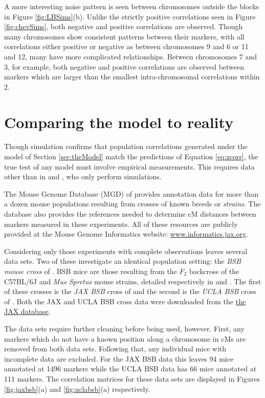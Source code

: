 \documentclass[sts]{imsart}
\begin{document}
A more interesting noise pattern is seen between chromosomes outside the blocks in Figure \ref{fig:LBSims}(b). Unlike the strictly positive correlations seen in Figure \ref{fig:chevSims}, both negative and positive correlations are observed. Though many chromosomes show consistent patterns between their markers, with all correlations either positive or negative as between chromosomes 9 and 6 or 11 and 12, many have more complicated relationships. Between chromosomes 7 and 3, for example, both negative and positive correlations are observed between markers which are larger than the smallest intra-chromosomal correlations within 2.

\section{Comparing the model to reality} \label{sec:model2real}

Though simulation confirms that population correlations generated under the model of Section \ref{sec:theModel} match the predictions of Equation \ref{eq:zcorr}, the true test of any model must involve empirical measurements. This requires data other than in \cite{LanderBotstein1989} and \cite{cheverud2001}, who only perform simulations.

The Mouse Genome Database (MGD) of \cite{bultetal2019mouse} provides annotation data for more than a dozen mouse populations resulting from crosses of known breeds or \emph{strains}. The database also provides the references needed to determine cM distances between markers measured in these experiments. All of these resources are publicly provided at the Mouse Genome Informatics website: \href{www.informatics.jax.org}{www.informatics.jax.org}.

Considering only those experiments with complete observations leaves several data sets. Two of these investigate an identical population setting: the \emph{BSB mouse cross} of \cite{fisleretal1993bsb}. BSB mice are those resulting from the $F_2$ backcross of the C57BL/6J and {\it Mus Spretus} mouse strains, detailed respectively in \cite{C57BL6J} and \cite{dejageretal2009mspretus}. The first of these crosses is the \emph{JAX BSB} cross of \cite{roweetal1994jaxbsb} and the second is the \emph{UCLA BSB} cross of \cite{welchetal1996uclabsb}. Both the JAX and UCLA BSB cross data were downloaded from the \href{www.informatics.jax.org/downloads/reports/index.html}{the JAX database}.

The data sets require further cleaning before being used, however. First, any markers which do not have a known position along a chromosome in cMs are removed from both data sets. Following that, any individual mice with incomplete data are excluded. For the JAX BSB data this leaves 94 mice annotated at 1496 markers while the UCLA BSB data has 66 mice annotated at 111 markers. The correlation matrices for these data sets are displayed in Figures \ref{fig:jaxbsb}(a) and \ref{fig:uclabsb}(a) respectively.
\end{document}
